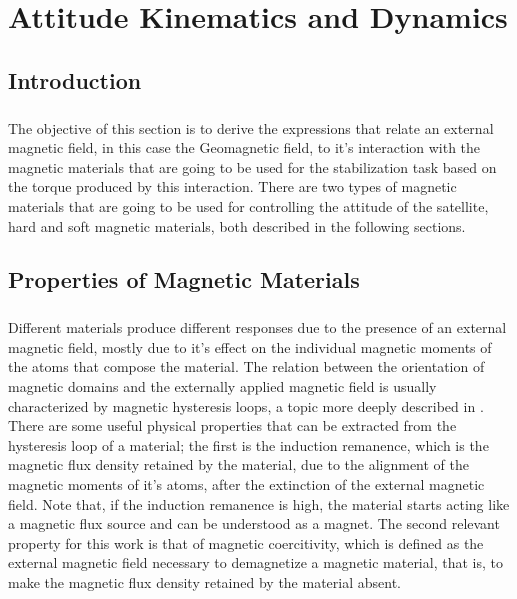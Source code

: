 %
%
%
%
%
%
%
%
%
%

\chapter{Attitude Kinematics and Dynamics} \label{ch:attitude-kinematics-dynamics}

\section{Introduction}

\paragraph{}
\indent 
	The objective of this section is to derive the expressions that relate an external magnetic field, in this case the Geomagnetic field, to it's interaction with the magnetic materials that are going to be used for the stabilization task based on the torque produced by this interaction. There are two types of magnetic materials that are going to be used for controlling the attitude of the satellite, hard and soft magnetic materials, both described in the following sections.

\section{Properties of Magnetic Materials}

\paragraph{}
\indent
	Different materials produce different responses due to the presence of an external magnetic field, mostly due to it's effect on the individual magnetic moments of the atoms that compose the material. The relation between the orientation of magnetic domains and the externally applied magnetic field is usually characterized by magnetic hysteresis loops, a topic more deeply described in \cite{ZAMBONETTI}. There are some useful physical properties that can be extracted from the hysteresis loop of a material; the first is the induction remanence, which is the magnetic flux density retained by the material, due to the alignment of the magnetic moments of it's atoms, after the extinction of the external magnetic field. Note that, if the induction remanence is high, the material starts acting like a magnetic flux source and can be understood as a magnet. The second relevant property for this work is that of magnetic coercitivity, which is defined as the external magnetic field necessary to demagnetize a magnetic material, that is, to make the magnetic flux density retained by the material absent.

